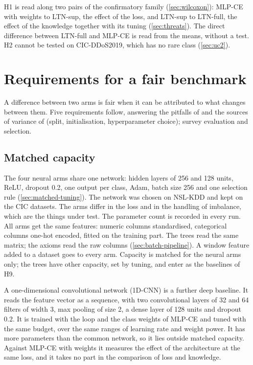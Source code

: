 H1 is read along two pairs of the confirmatory family (\cref{sec:wilcoxon}): MLP-CE with
weights to LTN-sup, the effect of the loss, and LTN-sup to LTN-full, the effect of the
knowledge together with its tuning (\cref{sec:threats}). The direct difference between LTN-full and MLP-CE is read from the means, without a test. H2 cannot be tested on CIC-DDoS2019,
which has no rare class (\cref{sec:uc2}).

\section{Requirements for a fair benchmark}
\label{sec:fair-benchmark}

A difference between two arms is fair when it can be attributed to what changes between
them. Five requirements follow, answering the pitfalls of \citet{arp2022dosdonts} and the
sources of variance of \citet{bouthillier2021variance} (split, initialisation, hyperparameter
choice); \citet{raschka2018model} survey evaluation and selection.

\subsection{Matched capacity}
\label{sec:matched-capacity}

The four neural arms share one network: hidden layers of 256 and 128 units, ReLU, dropout
0.2, one output per class, Adam, batch size 256 and one selection rule
(\cref{sec:matched-tuning}). The network was chosen on NSL-KDD and kept on the CIC datasets.
The arms differ in the loss and in the handling of imbalance, which are the things under
test. The parameter count is recorded in every run.
All arms get the same features: numeric columns standardised, categorical columns one-hot
encoded, fitted on the training part. The trees read the same matrix; the axioms read the raw
columns (\cref{sec:batch-pipeline}). A window feature added to a dataset goes to every arm.
Capacity is matched for the neural arms only; the trees have other capacity, set by tuning,
and enter as the baselines of H9.

A one-dimensional convolutional network (1D-CNN) is a further deep baseline. It reads the
feature vector as a sequence, with two convolutional layers of 32 and 64 filters of width 3,
max pooling of size 2, a dense layer of 128 units and dropout 0.2. It is trained with the loop
and the class weights of MLP-CE and tuned with the same budget, over the same ranges of learning
rate and weight power. It has more parameters than the common network, so it lies outside
matched capacity. Against MLP-CE with weights it measures the effect of the architecture at the
same loss, and it takes no part in the comparison of loss and knowledge.

